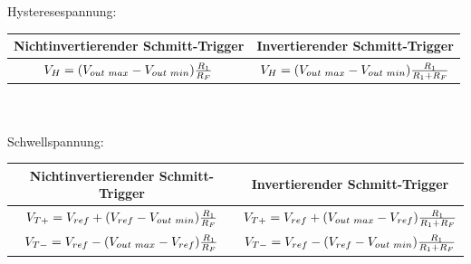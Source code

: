 			\begin{minipage}{18cm}
               	Hysteresespannung:\\
               	\hspace*{10mm}
               	\begin{tabular}{| c | c |}
                \hline
                Nichtinvertierender Schmitt-Trigger & Invertierender
                Schmitt-Trigger\\
                \hline
                $V_H=(V_{out \hspace{1mm} max}-V_{out \hspace{1mm}
                min})\frac{R_1}{R_F}$ &
                $V_H=(V_{out \hspace{1mm} max}-V_{out \hspace{1mm}
                min})\frac{R_1}{R_1+R_F}$\\
                \hline
            \end{tabular}\\ \\
				Schwellspannung:\\
				\hspace*{10mm}
			\begin{tabular}{| c | c |}
                \hline
                Nichtinvertierender Schmitt-Trigger & Invertierender
                Schmitt-Trigger\\
                \hline
                $V_{T+}=V_{ref}+(V_{ref}-V_{out
                \hspace{1mm} min})\frac{R_1}{R_F}$ &
                $V_{T+}=V_{ref}+(V_{out \hspace{1mm}
                max}-V_{ref})\frac{R_1}{R_1+R_F}$\\
                \hline
                $V_{T-}=V_{ref}-(V_{out
                \hspace{1mm} max}-V_{ref})\frac{R_1}{R_F}$ &
                $V_{T-}=V_{ref}-(V_{ref}-V_{out \hspace{1mm}
                min})\frac{R_1}{R_1+R_F}$\\
                \hline
            \end{tabular}\\
            \end{minipage}

\newpage
	
